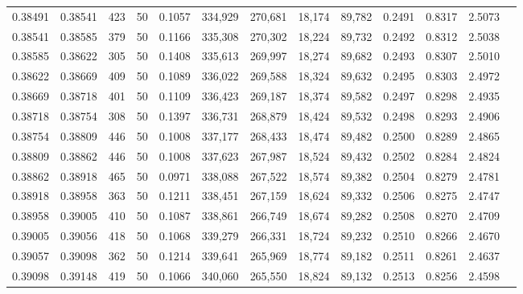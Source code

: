 \begin{tabular}{rrrrrrrrrrrrr}
0.38491 & 0.38541 &   423 &  50 &                                     0.1057 & 334,929 & 270,681 &  18,174 &  89,782 & 0.2491 & 0.8317 & 2.5073 \\
0.38541 & 0.38585 &   379 &  50 &                                     0.1166 & 335,308 & 270,302 &  18,224 &  89,732 & 0.2492 & 0.8312 & 2.5038 \\
0.38585 & 0.38622 &   305 &  50 &                                     0.1408 & 335,613 & 269,997 &  18,274 &  89,682 & 0.2493 & 0.8307 & 2.5010 \\
0.38622 & 0.38669 &   409 &  50 &                                     0.1089 & 336,022 & 269,588 &  18,324 &  89,632 & 0.2495 & 0.8303 & 2.4972 \\
0.38669 & 0.38718 &   401 &  50 &                                     0.1109 & 336,423 & 269,187 &  18,374 &  89,582 & 0.2497 & 0.8298 & 2.4935 \\
0.38718 & 0.38754 &   308 &  50 &                                     0.1397 & 336,731 & 268,879 &  18,424 &  89,532 & 0.2498 & 0.8293 & 2.4906 \\
0.38754 & 0.38809 &   446 &  50 &                                     0.1008 & 337,177 & 268,433 &  18,474 &  89,482 & 0.2500 & 0.8289 & 2.4865 \\
0.38809 & 0.38862 &   446 &  50 &                                     0.1008 & 337,623 & 267,987 &  18,524 &  89,432 & 0.2502 & 0.8284 & 2.4824 \\
0.38862 & 0.38918 &   465 &  50 &                                     0.0971 & 338,088 & 267,522 &  18,574 &  89,382 & 0.2504 & 0.8279 & 2.4781 \\
0.38918 & 0.38958 &   363 &  50 &                                     0.1211 & 338,451 & 267,159 &  18,624 &  89,332 & 0.2506 & 0.8275 & 2.4747 \\
0.38958 & 0.39005 &   410 &  50 &                                     0.1087 & 338,861 & 266,749 &  18,674 &  89,282 & 0.2508 & 0.8270 & 2.4709 \\
0.39005 & 0.39056 &   418 &  50 &                                     0.1068 & 339,279 & 266,331 &  18,724 &  89,232 & 0.2510 & 0.8266 & 2.4670 \\
0.39057 & 0.39098 &   362 &  50 &                                     0.1214 & 339,641 & 265,969 &  18,774 &  89,182 & 0.2511 & 0.8261 & 2.4637 \\
0.39098 & 0.39148 &   419 &  50 &                                     0.1066 & 340,060 & 265,550 &  18,824 &  89,132 & 0.2513 & 0.8256 & 2.4598 \\

\end{tabular}

